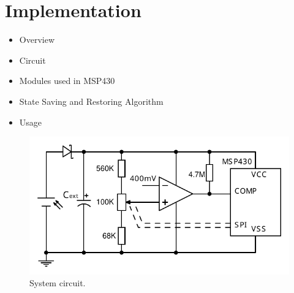 \section{Implementation} \label{sec:implementation}

\begin{itemize}
    \item Overview
    \item Circuit
    \item Modules used in MSP430 
    \item State Saving and Restoring Algorithm
    \item Usage
\end{itemize}

\begin{figure}[!t]
    \centering
    \includegraphics[width=\columnwidth]{ch5_optic/figures/circuit_v2.pdf}
    \caption{System circuit. }
    \label{fig:schematic}
\end{figure}

